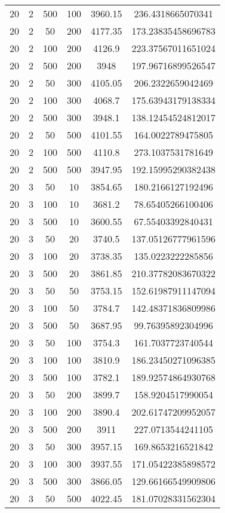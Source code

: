 {\begin{longtabu}{S
S
S
S
S[round-mode=places, round-precision=0]
S[round-mode=places, round-precision=0]}
20 & 2 & 500 & 100 & 3960.15 & 236.4318665070341 \\
20 & 2 & 50 & 200 & 4177.35 & 173.23835458696783 \\
20 & 2 & 100 & 200 & 4126.9 & 223.37567011651024 \\
20 & 2 & 500 & 200 & 3948 & 197.96716899526547 \\
20 & 2 & 50 & 300 & 4105.05 & 206.2322659042469 \\
20 & 2 & 100 & 300 & 4068.7 & 175.63943179138334 \\
20 & 2 & 500 & 300 & 3948.1 & 138.12454524812017 \\
20 & 2 & 50 & 500 & 4101.55 & 164.0022789475805 \\
20 & 2 & 100 & 500 & 4110.8 & 273.1037531781649 \\
20 & 2 & 500 & 500 & 3947.95 & 192.15995290382438 \\
20 & 3 & 50 & 10 & 3854.65 & 180.2166127192496 \\
20 & 3 & 100 & 10 & 3681.2 & 78.65405266100406 \\
20 & 3 & 500 & 10 & 3600.55 & 67.55403392840431 \\
20 & 3 & 50 & 20 & 3740.5 & 137.05126777961596 \\
20 & 3 & 100 & 20 & 3738.35 & 135.0223222285856 \\
20 & 3 & 500 & 20 & 3861.85 & 210.37782083670322 \\
20 & 3 & 50 & 50 & 3753.15 & 152.61987911147094 \\
20 & 3 & 100 & 50 & 3784.7 & 142.48371836809986 \\
20 & 3 & 500 & 50 & 3687.95 & 99.76395892304996 \\
20 & 3 & 50 & 100 & 3754.3 & 161.7037723740544 \\
20 & 3 & 100 & 100 & 3810.9 & 186.23450271096385 \\
20 & 3 & 500 & 100 & 3782.1 & 189.92574864930768 \\
20 & 3 & 50 & 200 & 3899.7 & 158.9204517990054 \\
20 & 3 & 100 & 200 & 3890.4 & 202.61747209952057 \\
20 & 3 & 500 & 200 & 3911 & 227.0713544241105 \\
20 & 3 & 50 & 300 & 3957.15 & 169.8653216521842 \\
20 & 3 & 100 & 300 & 3937.55 & 171.05422385898572 \\
20 & 3 & 500 & 300 & 3866.05 & 129.66166549909806 \\
20 & 3 & 50 & 500 & 4022.45 & 181.07028331562304 \\

\end{longtabu}}
